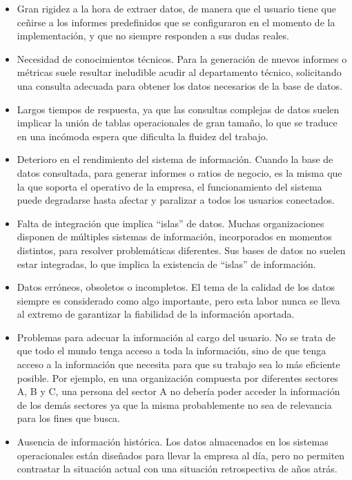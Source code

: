 \documentclass[a4paper,11pt]{article}
\begin{document}
    \begin{itemize}
      \item Gran rigidez a la hora de extraer datos, de manera que el usuario tiene que ceñirse a los informes predefinidos que se configuraron en el
      momento de la implementación, y que no siempre responden a sus dudas reales.
      \item Necesidad de conocimientos técnicos. Para la generación de nuevos informes o métricas suele resultar ineludible acudir al departamento técnico,
      solicitando una consulta adecuada para obtener los datos necesarios de la base de datos.
      \item Largos tiempos de respuesta, ya que las consultas complejas de datos suelen implicar la unión de tablas operacionales de gran tamaño, lo que se
      traduce en una incómoda espera que dificulta la fluidez del trabajo.
      \item Deterioro en el rendimiento del sistema de información. Cuando la base de datos consultada, para generar informes o ratios de negocio, es la
      misma que la que soporta el operativo de la empresa, el funcionamiento del sistema puede degradarse hasta afectar y paralizar a todos los usuarios
      conectados.
      \item Falta de integración que implica ``islas'' de datos. Muchas organizaciones disponen de múltiples sistemas de información, incorporados en
      momentos distintos, para resolver problemáticas diferentes. Sus bases de datos no suelen estar integradas, lo que implica la existencia de ``islas''
      de información.
      \item Datos erróneos, obsoletos o incompletos. El tema de la calidad de los datos siempre es considerado como algo importante, pero esta labor nunca
      se lleva al extremo de garantizar la fiabilidad de la información aportada.
      \item Problemas para adecuar la información al cargo del usuario. No se trata de que todo el mundo tenga acceso a toda la información, sino de que
      tenga acceso a la información que necesita para que su trabajo sea lo más eficiente posible. Por ejemplo, en una organización compuesta por
      diferentes sectores A, B y C, una persona del sector A no debería poder acceder la información de los demás sectores ya que la misma probablemente
      no sea de relevancia para los fines que busca.
      \item Ausencia de información histórica. Los datos almacenados en los sistemas operacionales están diseñados para llevar la empresa al día, pero no
      permiten contrastar la situación actual con una situación retrospectiva de años atrás.
    \end{itemize}
    
\end{document}
